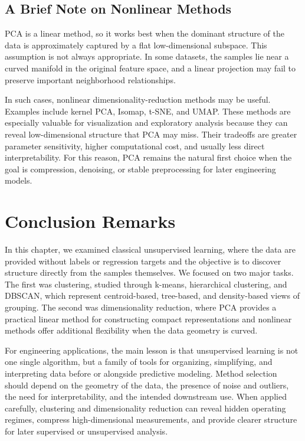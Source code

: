 \documentclass[12pt]{article}
\begin{document}
\subsection{A Brief Note on Nonlinear Methods}

PCA is a linear method, so it works best when the dominant structure of the data is approximately captured by a flat low-dimensional subspace. This assumption is not always appropriate. In some datasets, the samples lie near a curved manifold in the original feature space, and a linear projection may fail to preserve important neighborhood relationships.

In such cases, nonlinear dimensionality-reduction methods may be useful. Examples include kernel PCA, Isomap, t-SNE, and UMAP. These methods are especially valuable for visualization and exploratory analysis because they can reveal low-dimensional structure that PCA may miss. Their tradeoffs are greater parameter sensitivity, higher computational cost, and usually less direct interpretability. For this reason, PCA remains the natural first choice when the goal is compression, denoising, or stable preprocessing for later engineering models.

\section{Conclusion Remarks}
In this chapter, we examined classical unsupervised learning, where the data are provided without labels or regression targets and the objective is to discover structure directly from the samples themselves. We focused on two major tasks. The first was clustering, studied through k-means, hierarchical clustering, and DBSCAN, which represent centroid-based, tree-based, and density-based views of grouping. The second was dimensionality reduction, where PCA provides a practical linear method for constructing compact representations and nonlinear methods offer additional flexibility when the data geometry is curved.

For engineering applications, the main lesson is that unsupervised learning is not one single algorithm, but a family of tools for organizing, simplifying, and interpreting data before or alongside predictive modeling. Method selection should depend on the geometry of the data, the presence of noise and outliers, the need for interpretability, and the intended downstream use. When applied carefully, clustering and dimensionality reduction can reveal hidden operating regimes, compress high-dimensional measurements, and provide clearer structure for later supervised or unsupervised analysis.
\end{document}
